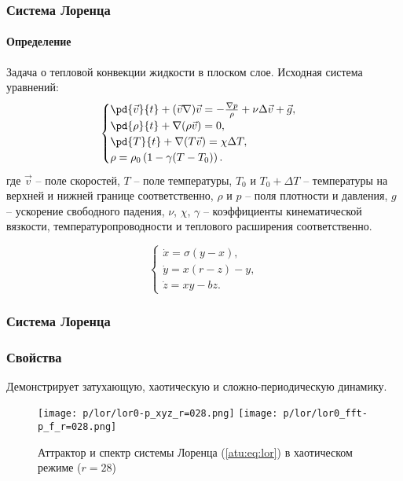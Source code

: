 \documentclass[10pt,utf8]{beamer}
\begin{document}

\begin{frame}
  \frametitle{Система Лоренца}
  \framesubtitle{Определение}

Задача о тепловой конвекции жидкости в плоском слое. Исходная система уравнений:
%
  \begin{equation}
  \begin{cases}
    \pd{\vec{v}}{t} + ( \vec{v} \nabla ) \vec{v} = - \frac{\nabla p}{\rho} + \nu \Delta \vec{v} + \vec{g}, \\
    \pd{\rho}{t} + \nabla ( \rho \vec{v} ) = 0 , \\
    \pd{T}{t} +\nabla ( T \vec{v} ) = \chi \Delta T , \\
    \rho = \rho_0 \left( 1 - \gamma (T - T_0) \right) .
  \end{cases}
  \label{atu:eq:lor_gidro}
  \end{equation}
  где
  $\vec{v} $   -- поле скоростей,
  $T$ -- поле температуры,
  $T_0$ и $T_0+\Delta T$   -- температуры на верхней и нижней границе соответственно,
  $\rho$ и $p$ -- поля плотности и давления,
  $g$ -- ускорение свободного падения,
  $\nu$, $\chi$, $\gamma$  -- коэффициенты кинематической вязкости, температуропроводности и
  теплового расширения соответственно.

%
  \begin{equation}
  \begin{cases}
    \dot{x} = \sigma (y-x ) , \\
    \dot{y} = x (r-z) - y , \\
    \dot{z} = x y - b z .
  \end{cases}
  \label{atu:eq:lor}
  \end{equation}

\end{frame}




\begin{frame}
  \frametitle{Система Лоренца}
  \frametitle{Свойства}

  Демонстрирует затухающую, хаотическую и сложно-периодическую динамику.

  \begin{figure}[h!]
  \begin{center}
    \texttt{[image: p/lor/lor0-p\_xyz\_r=028.png]}
    \hfill
    \texttt{[image: p/lor/lor0\_fft-p\_f\_r=028.png]}
  \end{center}
    \caption{Аттрактор и спектр системы Лоренца (\ref{atu:eq:lor}) в хаотическом режиме ($r=28$)}
  \label{atu:f:lor_attractor_phase_chaos28}
  \end{figure}

\end{frame}
\end{document}
